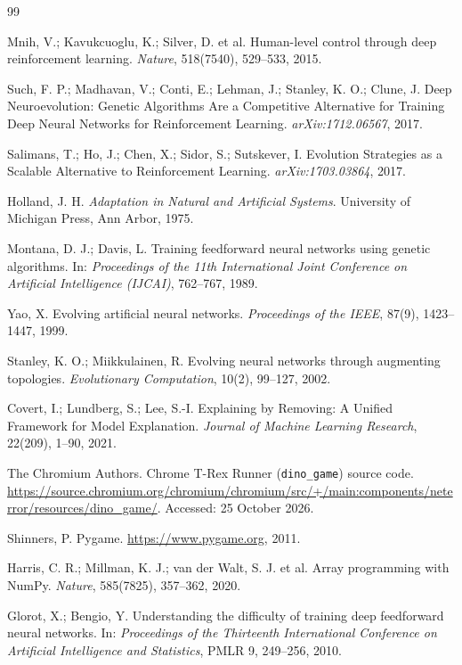 \documentclass[11pt,a4paper]{article}
\begin{document}
\begin{thebibliography}{99}

Mnih, V.; Kavukcuoglu, K.; Silver, D. et al. Human-level control through deep reinforcement learning. \textit{Nature}, 518(7540), 529--533, 2015.

Such, F. P.; Madhavan, V.; Conti, E.; Lehman, J.; Stanley, K. O.; Clune, J. Deep Neuroevolution: Genetic Algorithms Are a Competitive Alternative for Training Deep Neural Networks for Reinforcement Learning. \textit{arXiv:1712.06567}, 2017.

Salimans, T.; Ho, J.; Chen, X.; Sidor, S.; Sutskever, I. Evolution Strategies as a Scalable Alternative to Reinforcement Learning. \textit{arXiv:1703.03864}, 2017.

Holland, J. H. \textit{Adaptation in Natural and Artificial Systems}. University of Michigan Press, Ann Arbor, 1975.

Montana, D. J.; Davis, L. Training feedforward neural networks using genetic algorithms. In: \textit{Proceedings of the 11th International Joint Conference on Artificial Intelligence (IJCAI)}, 762--767, 1989.

Yao, X. Evolving artificial neural networks. \textit{Proceedings of the IEEE}, 87(9), 1423--1447, 1999.

Stanley, K. O.; Miikkulainen, R. Evolving neural networks through augmenting topologies. \textit{Evolutionary Computation}, 10(2), 99--127, 2002.

Covert, I.; Lundberg, S.; Lee, S.-I. Explaining by Removing: A Unified Framework for Model Explanation. \textit{Journal of Machine Learning Research}, 22(209), 1--90, 2021.

The Chromium Authors. Chrome T-Rex Runner (\texttt{dino\_game}) source code. \url{https://source.chromium.org/chromium/chromium/src/+/main:components/neterror/resources/dino_game/}. Accessed: 25 October 2026.

Shinners, P. Pygame. \url{https://www.pygame.org}, 2011.

Harris, C. R.; Millman, K. J.; van der Walt, S. J. et al. Array programming with NumPy. \textit{Nature}, 585(7825), 357--362, 2020.

Glorot, X.; Bengio, Y. Understanding the difficulty of training deep feedforward neural networks. In: \textit{Proceedings of the Thirteenth International Conference on Artificial Intelligence and Statistics}, PMLR 9, 249--256, 2010.


\end{thebibliography}
\end{document}
